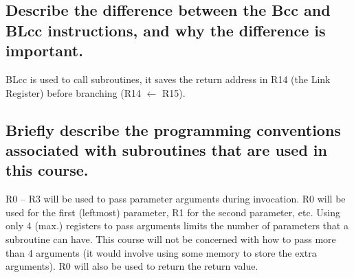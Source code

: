 \documentclass{article}
\begin{document}
	\subsection{Describe the difference between the Bcc and BLcc instructions, and why the difference is important.}
	BLcc is used to call subroutines, it saves the return address in R14 (the Link Register) before branching (R14 $\leftarrow$ R15).
	
	\subsection{Briefly describe the programming conventions associated with subroutines that are used in this course.}
	R0 – R3 will be used to pass parameter arguments during invocation. R0 will be used for the first (leftmost) parameter, R1 for the second parameter, etc. Using only 4 (max.) registers to pass arguments limits the number of parameters that a subroutine can have. This course will not be concerned with how to pass more than 4 arguments (it would involve using some memory to store the extra arguments). R0 will also be used to return the return value.
\end{document}
